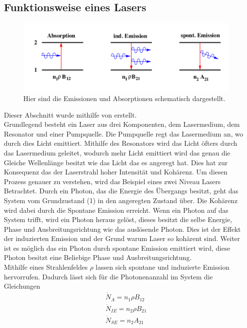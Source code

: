\subsection{Funktionsweise eines Lasers}
\begin{figure}[b!]
	\centering
	\includegraphics[width = \textwidth]{../Grafiken/Emission.pdf}
	\caption{Hier sind die Emissionen und Absorptionen schematisch dargestellt.\cite{V61}}
\end{figure}
Dieser Abschnitt wurde mithilfe von \cite{V61} erstellt.\\
Grundlegend besteht ein Laser aus drei Komponenten, dem Lasermedium, dem Resonator und einer Pumpquelle.
Die Pumpquelle regt das Lasermedium an, wo durch dies Licht emittiert.
Mithilfe des Resonators wird das Licht öfters durch das Lasermedium geleitet, wodurch mehr Licht emittiert wird das genau die Gleiche Wellenlänge besitzt wie das Licht das es angeregt hat.
Dies hat zur Konsequenz das der Laserstrahl hoher Intensität und  Kohärenz.
Um diesen Prozess genauer zu verstehen, wird das Beispiel eines zwei Niveau Lasers Betrachtet.
Durch ein Photon, das die Energie des Übergangs besitzt, geht das System vom Grundzustand (1) in den angeregten Zustand über.
Die Kohärenz wird dabei durch die Spontane Emission erreicht.
Wenn ein Photon auf das System  trifft, wird ein Photon heraus gelöst, dieses besitzt die selbe Energie, Phase und Ausbreitungsrichtung wie das auslösende Photon.
Dies ist der Effekt der induzierten Emission und der Grund warum Laser so kohärent sind.
Weiter ist es möglich das ein Photon durch spontane Emission emittiert wird, diese Photon besitzt eine Beliebige Phase und Ausbreitungsrichtung.\\
Mithilfe eines Strahlenfeldes $\rho$ lassen sich spontane und induzierte Emission hervorrufen.
Dadurch lässt sich für die Photonenanzahl im System die Gleichungen
\begin{align}
	\dot{N}_A=n_1\rho B_{12}\\
	\dot{N}_{IE}=n_2\rho B_{21}\\
	\dot{N}_{SE}=n_2A_{21}
\end{align}
